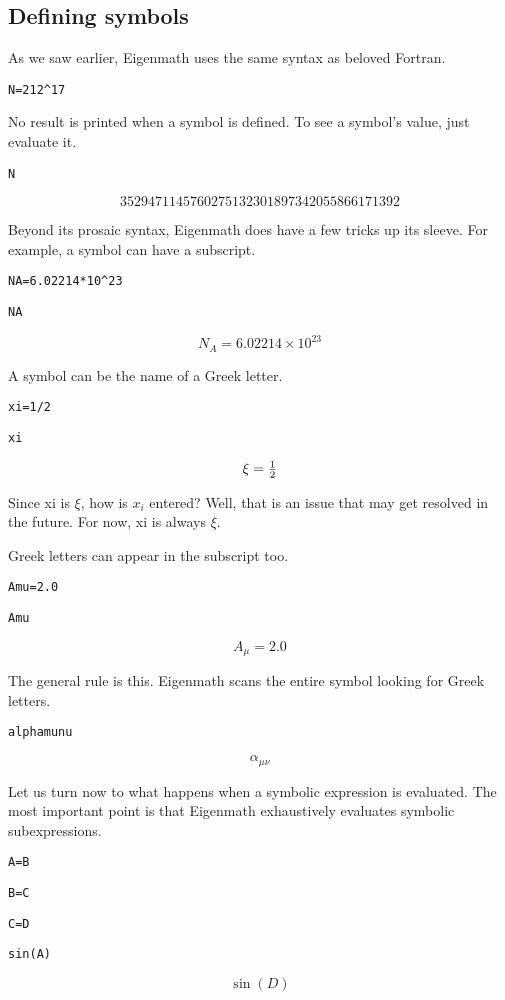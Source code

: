 
\subsection{Defining symbols}
As we saw earlier, Eigenmath uses the same syntax as beloved Fortran.

\medskip
\verb$N=212^17$

\medskip
\noindent
No result is printed when a symbol is defined.
To see a symbol's value, just evaluate it.

\medskip
\verb$N$

$$3529471145760275132301897342055866171392$$

\medskip
\noindent
Beyond its prosaic syntax, Eigenmath does have a few tricks up its sleeve.
For example, a symbol can have a subscript.

\medskip
\verb$NA=6.02214*10^23$

\verb$NA$

$$N_A=6.02214\times10^{23}$$

\medskip
\noindent
A symbol can be the name of a Greek letter.

\medskip
\verb$xi=1/2$

\verb$xi$

$$\xi=\hbox{$1\over2$}$$

\medskip
\noindent
Since xi is $\xi$, how is $x_i$ entered?
Well, that is an issue that may get resolved in the future.
For now, xi is always $\xi$.

\medskip
\noindent
Greek letters can appear in the subscript too.

\medskip
\verb$Amu=2.0$

\verb$Amu$

$$A_\mu=2.0$$

\medskip
\noindent
The general rule is this.
Eigenmath scans the entire symbol looking for Greek letters.

\medskip
\verb$alphamunu$

$$\alpha_{\mu\nu}$$

\newpage

\medskip
\noindent
Let us turn now to what happens when a symbolic expression is evaluated.
The most important point is that
Eigenmath exhaustively evaluates symbolic subexpressions.

\medskip
\verb$A=B$

\verb$B=C$

\verb$C=D$

\verb$sin(A)$

$$\sin(D)$$

